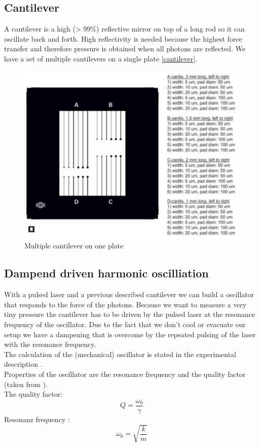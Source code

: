 \documentclass[12pt,a4paper]{article}
\begin{document}
\begin{multicols}{2}
\subsection{Cantilever}
A cantilever is a high (> 99\%) reflective mirror on top of a long rod so it can oscillate back and forth.
High reflectivity is needed because the highest force transfer and therefore pressure is obtained when all photons are reflected. We have a set of multiple cantilevers on a single plate \ref{cantilever}.
\begin{figure}[H]
	\centering
	\includegraphics[scale=0.2]{../figures/cantilever.png}
	\caption{Multiple cantilever on one plate \cite{physikwiki}}
	\label{fig:cantilever}
\end{figure}
\subsection{Dampend driven harmonic oscilliation}
With a pulsed laser and a previous described cantilever we can build a oscillator that responds to the force of the photons. Because we want to measure a very tiny pressure the cantilever has to be driven by the pulsed laser at the resonance frequency of the oscillator. Due to the fact that we don't cool or evacuate our setup we have a dampening that is overcome by the repeated pulsing of the laser with the resonance frequency.\\
The calculation of the (mechanical) oscillator is stated in the experimental description \cite{physikwiki}.\\
Properties of the oscillator are the resonance frequency and the quality factor (taken from \cite{physikwiki}).\\
The quality factor:
$$Q = \frac{\omega_0}{\gamma}$$
Resonanz frequency :
$$\omega_0 = \sqrt{\frac{k}{m}}$$


\end{multicols}
\end{document}
